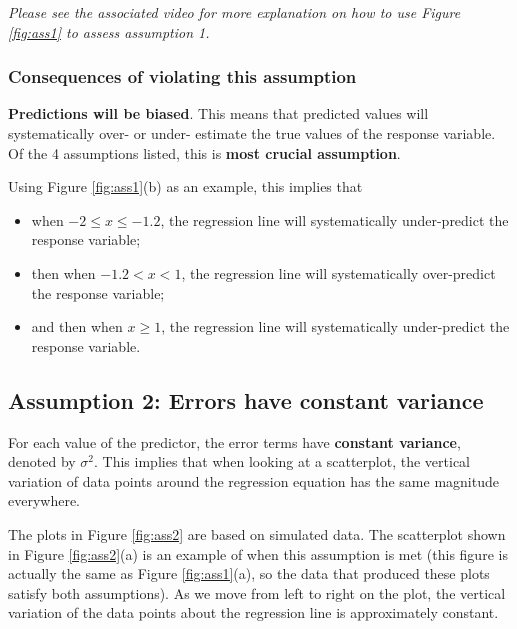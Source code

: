 \documentclass[
]{book}
\providecommand{\tightlist}{%
  \setlength{\itemsep}{0pt}\setlength{\parskip}{0pt}}
\begin{document}
\emph{Please see the associated video for more explanation on how to use Figure \ref{fig:ass1} to assess assumption 1.}

\hypertarget{consequences-of-violating-this-assumption}{%
\subsubsection{Consequences of violating this assumption}\label{consequences-of-violating-this-assumption}}

\textbf{Predictions will be biased}. This means that predicted values will systematically over- or under- estimate the true values of the response variable. Of the 4 assumptions listed, this is \textbf{most crucial assumption}.

Using Figure \ref{fig:ass1}(b) as an example, this implies that

\begin{itemize}
\tightlist
\item
  when \(-2 \leq x \leq -1.2\), the regression line will systematically under-predict the response variable;
\item
  then when \(-1.2 < x < 1\), the regression line will systematically over-predict the response variable;
\item
  and then when \(x \geq 1\), the regression line will systematically under-predict the response variable.
\end{itemize}

\hypertarget{assumption-2-errors-have-constant-variance}{%
\subsection{Assumption 2: Errors have constant variance}\label{assumption-2-errors-have-constant-variance}}

For each value of the predictor, the error terms have \textbf{constant variance}, denoted by \(\sigma^2\). This implies that when looking at a scatterplot, the vertical variation of data points around the regression equation has the same magnitude everywhere.

The plots in Figure \ref{fig:ass2} are based on simulated data. The scatterplot shown in Figure \ref{fig:ass2}(a) is an example of when this assumption is met (this figure is actually the same as Figure \ref{fig:ass1}(a), so the data that produced these plots satisfy both assumptions). As we move from left to right on the plot, the vertical variation of the data points about the regression line is approximately constant.
\end{document}
